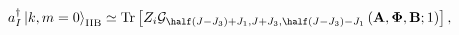 \begin{equation}
a_I^\dagger \left| k, m=0 \right>_{\mathrm{IIB}} \simeq 
  \mathrm{Tr} \left[  Z_i
             \mathcal{G}_{\half (J-J_3) + J_1,J + J_3,\half (J-J_3) - J_1} 
                \left( \mathbf{A}, \mathbf{\Phi}, \mathbf{B}; 1 \right) 
              \right], 
\end{equation}

